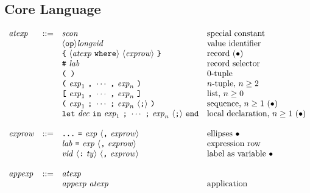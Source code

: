 \documentclass[twoside,titlepage]{article}
\begin{document}
\begin{appendix}
\subsection{Core Language}
\label{coregrammar}

  $$
  \begin{array}{llll}
  \mathit{atexp} & ::= & \mathit{scon} & \textrm{special constant} \\
  && \langle{\tt{op}}\rangle\mathit{longvid} & \textrm{value identifier} \\
  && \mbox{\tt\{}~\langle\mathit{atexp}~{\tt{where}}\rangle~\langle\mathit{exprow}\rangle~\mbox{\tt\}} & \textrm{record $(\bullet)$} \\
  && \mbox{\tt\#}~\mathit{lab} & \textrm{record selector} \\
  && \mbox{\tt( )} & \textrm{$0$-tuple} \\
  && \mbox{\tt(}~\mathit{exp}_1~\mbox{\tt,}~\cdots~\mbox{\tt,}~\mathit{exp}_n~\mbox{\tt)} & \textrm{$n$-tuple, $n\geq2$} \\
  && \mbox{\tt[}~\mathit{exp}_1~\mbox{\tt,}~\cdots~\mbox{\tt,}~\mathit{exp}_n~\mbox{\tt]} & \textrm{list, $n\geq0$} \\
  && \mbox{\tt(}~\mathit{exp}_1~\mbox{\tt;}~\cdots~\mbox{\tt;}~\mathit{exp}_n~\langle\mbox{\tt;}\rangle~\mbox{\tt)} & \textrm{sequence, $n\geq1$ $(\bullet)$} \\
  && {\tt{let}}~\mathit{dec}~{\tt{in}}~\mathit{exp}_1~\mbox{\tt;}~\cdots~\mbox{\tt;}~\mathit{exp}_n~\langle\mbox{\tt;}\rangle~{\tt{end}} & \textrm{local declaration, $n\geq1$ $(\bullet)$} \\
  \\
  \mathit{exprow} & ::= & \mbox{\tt...}~\mbox{\tt=}~\mathit{exp}~\langle\mbox{\tt,}~\mathit{exprow}\rangle & \textrm{ellipses $\bullet$} \\
  && \mathit{lab}~\mbox{\tt=}~\mathit{exp}~\langle\mbox{\tt,}~\mathit{exprow}\rangle & \textrm{expression row} \\
  && \mathit{vid}~\langle\mbox{\tt:}~\mathit{ty}\rangle~\langle\mbox{\tt,}~\mathit{exprow}\rangle & \textrm{label as variable $\bullet$} \\
  \\
  \mathit{appexp} & ::= & \mathit{atexp} \\
  && \mathit{appexp}~\mathit{atexp} & \textrm{application} \\

\end{array}$$
\end{appendix}
\end{document}
